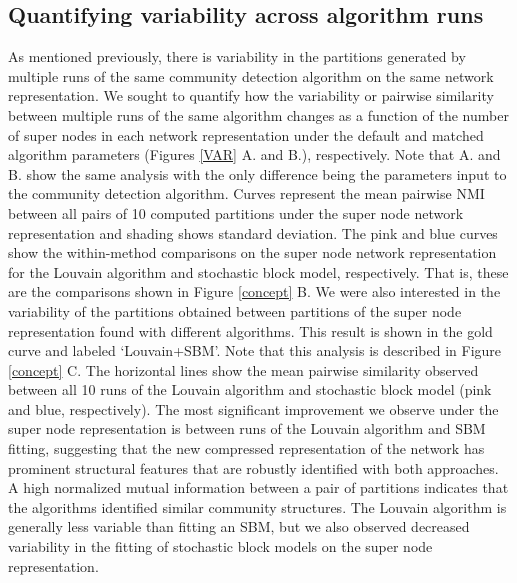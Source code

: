 \subsection{Quantifying variability across algorithm runs}
As mentioned previously, there is variability in the partitions generated by multiple runs of the same community detection algorithm on the same network representation. We sought to quantify how the variability or pairwise similarity between multiple runs of the same algorithm changes as a function of the number of super nodes in each network representation under the default and matched algorithm parameters (Figures \ref{VAR} A. and B.), respectively. Note that A. and B. show the same analysis with the only difference being the parameters input to the community detection algorithm. Curves represent the mean pairwise NMI between all pairs of 10 computed partitions under the super node network representation and shading shows standard deviation. The pink and blue curves show the within-method comparisons on the super node network representation for the Louvain algorithm and stochastic block model, respectively. That is, these are the comparisons shown in Figure \ref{concept} B. We were also interested in the variability of the partitions obtained between partitions of the super node representation found with different algorithms. This result is shown in the gold curve and labeled `Louvain+SBM'. Note that this analysis is described in Figure  \ref{concept} C. The horizontal lines show the mean pairwise similarity observed between all 10 runs of the Louvain algorithm and stochastic block model (pink and blue, respectively). The most significant improvement we observe under the super node representation is between runs of the Louvain algorithm and SBM fitting, suggesting that the new compressed representation of the network has prominent structural features that are robustly identified with both approaches. A high normalized mutual information between a pair of partitions indicates that the algorithms identified similar community structures.  The Louvain algorithm is generally less variable than fitting an SBM, but we also observed decreased variability in the fitting of stochastic block models on the super node representation. 

